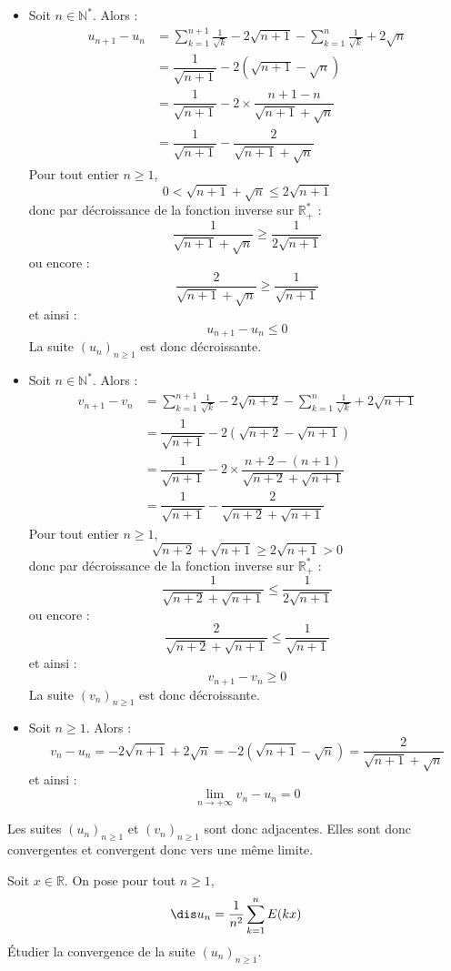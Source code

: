 \documentclass[a4paper,10pt]{report}
\begin{document}
\begin{itemize}
\item Soit $n \in \mathbb{N}^*$. Alors :
\begin{align*}
u_{n+1}-u_n & =  \sum_{k = 1}^{n+1} {\frac{1}{\sqrt k}} - 2\sqrt{n+1}  -\sum_{k = 1}^n {\frac{1}{\sqrt k}} + 2\sqrt{n}  \\
& = \dfrac{1}{\sqrt{n+1}} - 2 (\sqrt{n+1}-\sqrt{n}) \\
& = \dfrac{1}{\sqrt{n+1}} - 2 \times \dfrac{n+1-n}{\sqrt{n+1}+ \sqrt{n}} \\
& = \dfrac{1}{\sqrt{n+1}} - \dfrac{2}{\sqrt{n+1}+ \sqrt{n}}
\end{align*}
Pour tout entier $n \geq 1$,
$$ 0< \sqrt{n+1} + \sqrt{n} \leq 2 \sqrt{n+1}$$
donc par décroissance de la fonction inverse sur $\mathbb{R}_+^{*}$ :
$$ \dfrac{1}{\sqrt{n+1}+ \sqrt{n}} \geq \dfrac{1}{2 \sqrt{n+1}}$$
ou encore :
$$ \dfrac{2}{\sqrt{n+1}+\sqrt{n}} \geq \dfrac{1}{\sqrt{n+1}}$$
et ainsi :
$$ u_{n+1}-u_n \leq 0$$
La suite $(u_n)_{n \geq 1}$ est donc décroissante.
\item Soit $n \in \mathbb{N}^*$. Alors :
\begin{align*}
v_{n+1}-v_n & =  \sum_{k = 1}^{n+1} {\frac{1}{\sqrt k}} - 2\sqrt{n+2}  -\sum_{k = 1}^n {\frac{1}{\sqrt k}} + 2\sqrt{n+1}  \\
& = \dfrac{1}{\sqrt{n+1}} - 2 (\sqrt{n+2}-\sqrt{n+1}) \\
& = \dfrac{1}{\sqrt{n+1}} - 2 \times \dfrac{n+2-(n+1)}{\sqrt{n+2}+ \sqrt{n+1}} \\
& = \dfrac{1}{\sqrt{n+1}} - \dfrac{2}{\sqrt{n+2}+ \sqrt{n+1}}
\end{align*}
Pour tout entier $n \geq 1$,
$$ \sqrt{n+2} + \sqrt{n+1} \geq 2 \sqrt{n+1} > 0$$
donc par décroissance de la fonction inverse sur $\mathbb{R}_+^{*}$ :
$$ \dfrac{1}{\sqrt{n+2}+ \sqrt{n+1}} \leq \dfrac{1}{2 \sqrt{n+1}}$$
ou encore :
$$ \dfrac{2}{\sqrt{n+2}+\sqrt{n+1}} \leq \dfrac{1}{\sqrt{n+1}}$$
et ainsi :
$$ v_{n+1}-v_n \geq 0$$
La suite $(v_n)_{n \geq 1}$ est donc décroissante.
\item Soit $n \geq 1$. Alors :
$$ v_n- u_n = -2 \sqrt{n+1} + 2 \sqrt{n} = -2 (\sqrt{n+1}-\sqrt{n}) = \dfrac{2}{\sqrt{n+1}+\sqrt{n}}$$
et ainsi :
$$ \lim_{n \rightarrow + \infty} v_n -u_n = 0$$
\end{itemize}
Les suites $(u_n)_{n \geq 1}$ et $(v_n)_{n \geq 1}$ sont donc adjacentes. Elles sont donc convergentes et convergent donc vers une même limite.


 \medskip
 
\begin{Exa} Soit $x \in \mathbb{R}$. On pose pour tout $n \geq 1$, 
$$\dis u_n = \frac{1}{n^2} \sum_{k=1}^n E(kx)$$
Étudier la convergence de la suite $(u_n)_{n \geq 1}$.
\end{Exa}
\end{document}
